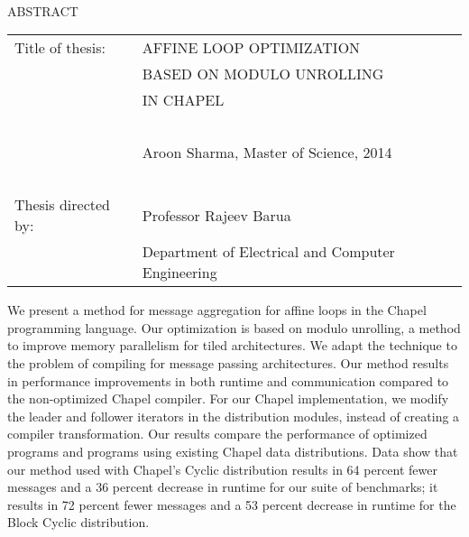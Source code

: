 
\hbox{\ }

\renewcommand{\baselinestretch}{1}
\small \normalsize

\begin{center}
\large{{ABSTRACT}} 

\vspace{3em} 

\end{center}
\hspace{-.15in}
\begin{tabular}{ll}
Title of thesis:    & {\large  AFFINE LOOP OPTIMIZATION }\\
&				      {\large  BASED ON MODULO UNROLLING} \\
&				      {\large  IN CHAPEL} \\
\ \\
&                          {\large  Aroon Sharma, Master of Science, 2014} \\
\ \\
Thesis directed by: & {\large  Professor Rajeev Barua} \\
&  				{\large	 Department of Electrical and Computer Engineering } \\
\end{tabular}

\vspace{3em}

\renewcommand{\baselinestretch}{2}
\large \normalsize

We present a method for message aggregation for affine loops in the Chapel programming language. Our optimization is based on modulo unrolling, a method to improve memory parallelism for tiled architectures. We adapt the technique to the problem of compiling for message passing architectures. Our method results in performance improvements in both runtime and communication compared to the non-optimized Chapel compiler. For our Chapel implementation, we modify the leader and follower iterators in the distribution modules, instead of creating a compiler transformation. Our results compare the performance of optimized programs and programs using existing Chapel data distributions. Data show that our method used with Chapel's Cyclic distribution results in 64 percent fewer messages and a 36 percent decrease in runtime for our suite of benchmarks; it results in 72 percent fewer messages and a 53 percent decrease in runtime for the Block Cyclic distribution. 


